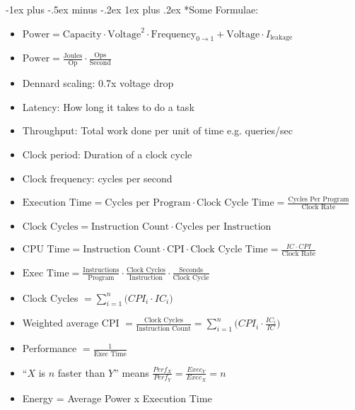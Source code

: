 \documentclass[landscape,10pt]{article}
\makeatletter
\renewcommand{\subsubsection}{\@startsection{subsubsection}{3}{0mm}%
            {-1ex plus -.5ex minus -.2ex}%
            {1ex plus .2ex}%
            {\normalfont\small\bfseries}}
\makeatother
\begin{document}
\footnotesize
\begin{multicols}{2}
\setlength{\premulticols}{1pt}
\setlength{\postmulticols}{1pt}
\setlength{\multicolsep}{1pt}
\setlength{\columnsep}{2pt}
\subsubsection*{Some Formulae:}
\begin{itemize}
    \item[] \(\text{Power} = \text{Capacity} \cdot \text{Voltage}^2 \cdot \text{Frequency}_{0 \rightarrow 1} + \text{Voltage}\cdot I_{\text{leakage}}\)
    \item[] \(\text{Power} = \frac{\text{Joules}}{\text{Op}} \cdot \frac{\text{Ops}}{\text{Second}}\)
    \item[] Dennard scaling: 0.7x voltage drop 
    \item[] Latency: How long it takes to do a task
    \item[] Throughput: Total work done per unit of time e.g. queries/sec
    \item[] Clock period: Duration of a clock cycle
    \item[] Clock frequency: cycles per second
    \item[] \(\text{Execution Time} = \text{Cycles per Program} \cdot \text{Clock Cycle Time} = \frac{\text{Cycles Per Program}}{\text{Clock Rate}}\)
    \item[] \(\text{Clock Cycles} = \text{Instruction Count} \cdot \text{Cycles per Instruction}\)
    \item[] \(\text{CPU Time} = \text{Instruction Count} \cdot \text{CPI} \cdot \text{Clock Cycle Time} = \frac{IC \cdot CPI}{\text{Clock Rate}}\)
    \item[] \(\text{Exec Time} = \frac{\text{Instructions}}{\text{Program}} \cdot \frac{\text{Clock Cycles}}{\text{Instruction}} \cdot \frac{\text{Seconds}}{\text{Clock Cycle}}\)
    \item[] Clock Cycles \(= \sum \limits_{i = 1}^{n} \big ( CPI_i \cdot IC_i \big) \)
    \item[] Weighted average CPI \(= \frac{\text{Clock Cycles}}{\text{Instruction Count}} = \sum \limits_{i=1}^{n} \Big ( CPI_i \cdot \frac {IC_i}{IC} \Big ) \)
    \item[] Performance \(= \frac{1}{\text{Exec Time}}\)
    \item[] ``\(X\) is \(n\) faster than \(Y\)'' means \(\frac{Perf_X}{Perf_Y} = \frac{Exec_Y}{Exec_X} = n\)
    \item[] Energy = Average Power x Execution Time

\end{itemize}
\end{multicols}
\end{document}
